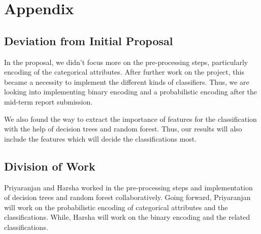 \documentclass{article} %
\begin{document}
	\newpage
	\appendix
	\section{Appendix} \label{App:Appendix}
	\subsection{Deviation from Initial Proposal}
	In the proposal, we didn't focus more on the pre-processing steps, particularly encoding of the categorical attributes. After further work on the project, this became a necessity to implement the different kinds of classifiers. Thus, we are looking into implementing binary encoding and a probabilistic encoding after the mid-term report submission.
	
	We also found the way to extract the importance of features for the classification with the help of decision trees and random forest. Thus, our results will also include the features which will decide the classifications most. 
	
	\subsection{Division of Work}
	Priyaranjan and Harsha worked in the pre-processing steps and implementation of decision trees and random forest collaboratively. Going forward, Priyaranjan will work on the probabilistic encoding of categorical attributes and the classifications. While, Harsha will work on the binary encoding and the related classifications.
	
\end{document}
